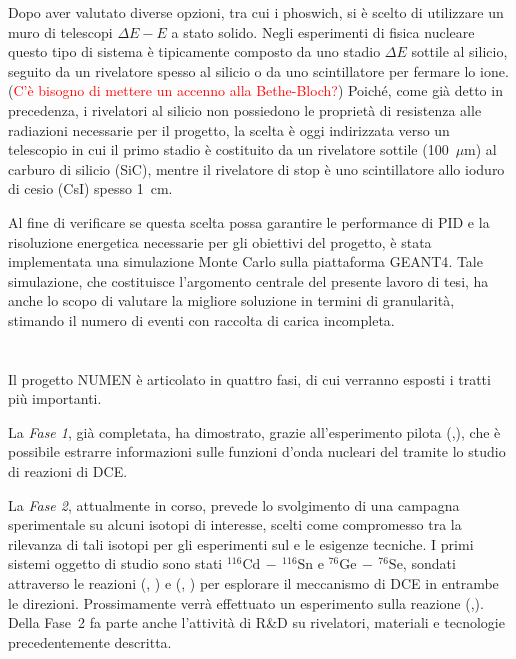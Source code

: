Dopo aver valutato diverse opzioni, tra cui i phoswich, si è scelto di utilizzare un muro di telescopi $ \Delta E - E $ a stato solido.
Negli esperimenti di fisica nucleare questo tipo di sistema è tipicamente composto da uno stadio $\Delta E$ sottile al silicio, seguito da un rivelatore spesso al silicio o da uno scintillatore per fermare lo ione. (\textcolor{red}{C'è bisogno di mettere un accenno alla Bethe-Bloch?}) 
Poiché, come già detto in precedenza, i rivelatori al silicio non possiedono le proprietà di resistenza alle radiazioni necessarie per il progetto, la scelta è oggi indirizzata verso un telescopio in cui il primo stadio è costituito da un rivelatore sottile (100~$\mu $m) al carburo di silicio\cite{tudisco:sensors18} (SiC), mentre il rivelatore di stop è uno scintillatore allo ioduro di cesio (CsI) spesso 1~cm.

Al fine di verificare se questa scelta possa garantire le performance di PID e la risoluzione energetica necessarie per gli obiettivi del progetto, è stata implementata una simulazione Monte Carlo sulla piattaforma GEANT4\cite{agostinelli:nima02}.
Tale simulazione, che costituisce l'argomento centrale del presente lavoro di tesi, ha anche lo scopo di valutare la migliore soluzione in termini di granularità, stimando il numero di eventi con raccolta di carica incompleta.








\section{}

Il progetto NUMEN è articolato in quattro fasi, di cui verranno esposti i tratti più importanti. 

La \emph{Fase 1}, già completata, ha dimostrato, grazie all'esperimento pilota (,), che è possibile estrarre informazioni sulle funzioni d'onda nucleari del \doppiobeta{} tramite lo studio di reazioni di DCE.

La \emph{Fase 2}, attualmente in corso, prevede lo svolgimento di una campagna sperimentale su alcuni isotopi di interesse, scelti come compromesso tra la rilevanza di tali isotopi per gli esperimenti sul \doppiobeta{} e le esigenze tecniche. I primi sistemi oggetto di studio sono stati $^{116}\mbox{Cd}\,  - \, ^{116}\mbox{Sn} $ e $^{76}\mbox{Ge}\,  - \, ^{76}\mbox{Se} $, sondati attraverso le reazioni (, ) e (, ) per esplorare il meccanismo di DCE in entrambe le direzioni. Prossimamente verrà effettuato un esperimento sulla reazione (,). 
Della Fase~2 fa parte anche l'attività di R\&D su rivelatori, materiali e tecnologie precedentemente descritta.

